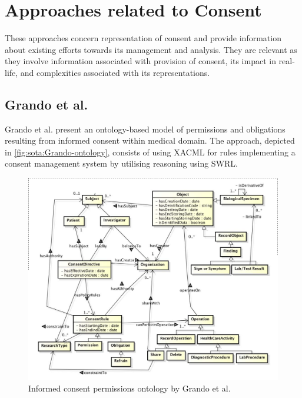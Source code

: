\section{Approaches related to Consent}\label{sec:sota:consent}
These approaches concern representation of consent and provide information about existing efforts towards its management and analysis. They are relevant as they involve information associated with provision of consent, its impact in real-life, and complexities associated with its representations.

\subsection*{Grando et al.}
Grando et al. \cite{grando_ontological_2012} present an ontology-based model of permissions and obligations resulting from informed consent within  medical domain. The approach, depicted in \autoref{fig:sota:Grando-ontology}, consists of using XACML for rules implementing a consent management system by utilising reasoning using SWRL.
\begin{figure}[htbp]
    \centering
    \includegraphics[width=0.75\linewidth]{img/Grando_ontology.png}
    \caption{Informed consent permissions ontology by Grando et al. \cite{grando_ontological_2012}}
    \label{fig:sota:Grando-ontology}
\end{figure}

